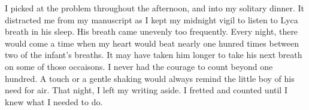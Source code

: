 \documentclass{article}
\begin{document}
I picked at the problem throughout the afternoon, and into my solitary dinner. It distracted me from my manuscript as I kept my midnight vigil to listen to Lyca breath in his sleep. His breath came unevenly too frequently. Every night, there would come a time when my heart would beat nearly one hunred times between two of the infant's breaths. It may have taken him longer to take his next breath on some of those occaisons. I never had the courage to count beyond one hundred. A touch or a gentle shaking would always remind the little boy of his need for air. That night, I left my writing aside. I fretted and counted until I knew what I needed to do. 

\begin{comment}
"Explain to me your relationship with General Romino." Dario asked when I asked him to name Timmon ambassador to Lir. "He must mean a lot to you for you to advocate for something your husband wishes for as well."

"My opinion on this matter has nothing to do with my husband's," I replied haughtily. "I simply want him gone from this city."

My brother knew the rumour about Timmon and myself. He gave me a knowing smile. "You are young, Nisrita. You will learn that these passions come and go like the wind. A lover's quarrel is hardly a reason to make a man ambassador."

"I am not his lover," I corrected. Somewhere between the rumour and the truth lay the key to what I wanted.

"Ex lover, then, since you have argued so passionately. That still does not qualify him for the post." 

"Oh?" he asked, incredulous, but interested. "I have heard that you had admitted to as much once. He wished to marry you, I believe, the same year you married Duke Griswold."

"That?" I asked, doing my best to imitate Sophia's casual grace. "I was young, foolish, and angry that he had left me. It was a childish attempt to get back at a man I had once loved."

"It was very foolish, sister," Dario reprimanded. "You left your name and honor to be smeared by all."

I bowed my head, giving my brother every reason to believe that he was simply counselling his misguided, pentinent younger sister on the mistakes of her youth. "It was, and I suffered much for it. I was not completely well at the time. A sort of madness and grief had set upon me during the year after my first husband's death. I loved my first husband. I had not had enough time to grieve before marrying again. Please, brother. Have pity on me for indiscretions conducted in grief and passion. I have not dishonoured Cortan. I have never known when to hold my tongue and when to speak."


\end{comment}
\end{document}
